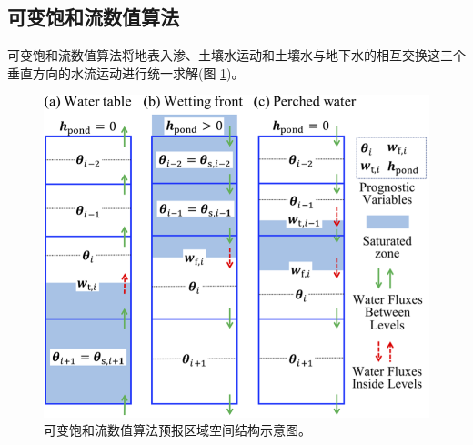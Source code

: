 \subsection{可变饱和流数值算法}
可变饱和流数值算法将地表入渗、土壤水运动和土壤水与地下水的相互交换这三个垂直方向的水流运动进行统一求解(图 \ref{fig:可变饱和流数值算法预报区域空间结构示意图})。
{
\begin{figure}[htbp]
\centering
\includegraphics{Figures/陆地表面的水分循环/可变饱和流数值算法预报区域空间结构示意图.png}
\caption{可变饱和流数值算法预报区域空间结构示意图。}
\label{fig:可变饱和流数值算法预报区域空间结构示意图}
\end{figure}
}

